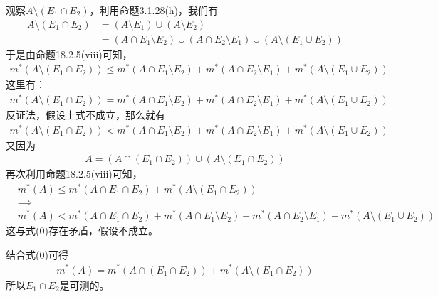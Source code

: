 \documentclass{article}
\begin{document}
\begin{itemize}
        观察$A \setminus (E_1 \cap E_2)$，利用命题3.1.28(h)，我们有
        \begin{align*}
          A \setminus (E_1 \cap E_2) & = (A \setminus E_1) \cup (A \setminus E_2)                                                    \\
                                     & =(A \cap E_1 \setminus E_2) \cup (A \cap E_2 \setminus E_1) \cup (A \setminus (E_1 \cup E_2))
        \end{align*}
        于是由命题18.2.5(viii)可知，
        \begin{align*}
          m^{\ast}(A \setminus (E_1 \cap E_2)) \leq m^{\ast}(A \cap E_1 \setminus E_2) + m^{\ast}(A \cap E_2 \setminus E_1) + m^{\ast}(A \setminus (E_1 \cup E_2))
        \end{align*}
        这里有：
        \begin{align*}
          m^{\ast}(A \setminus (E_1 \cap E_2)) = m^{\ast}(A \cap E_1 \setminus E_2) + m^{\ast}(A \cap E_2 \setminus E_1) + m^{\ast}(A \setminus (E_1 \cup E_2))
        \end{align*}
        反证法，假设上式不成立，那么就有
        \begin{align*}
          m^{\ast}(A \setminus (E_1 \cap E_2)) < m^{\ast}(A \cap E_1 \setminus E_2) + m^{\ast}(A \cap E_2 \setminus E_1) + m^{\ast}(A \setminus (E_1 \cup E_2))
        \end{align*}
        又因为
        \begin{align*}
          A = (A \cap (E_1 \cap E_2)) \cup (A \setminus (E_1 \cap E_2))
        \end{align*}
        再次利用命题18.2.5(viii)可知，
        \begin{align*}
           & m^{\ast}(A) \leq m^{\ast}(A \cap E_1 \cap E_2) + m^{\ast}(A \setminus (E_1 \cap E_2))                                                                        \\
           & \implies                                                                                                                                                     \\
           & m^{\ast}(A) < m^{\ast}(A \cap E_1 \cap E_2) + m^{\ast}(A \cap E_1 \setminus E_2) + m^{\ast}(A \cap E_2 \setminus E_1) + m^{\ast}(A \setminus (E_1 \cup E_2))
        \end{align*}
        这与式(0)存在矛盾，假设不成立。

        结合式(0)可得
        \begin{align}
          m^{\ast}(A) = m^{\ast}(A \cap (E_1 \cap E_2)) + m^{\ast}(A \setminus (E_1 \cap E_2))
        \end{align}
        所以$E_1 \cap E_2$是可测的。


\end{itemize}
\end{document}
